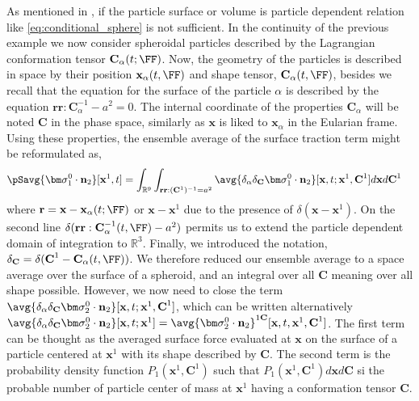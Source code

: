 As mentioned in \citet{hinch1977averaged}, if the particle surface or volume is particle dependent relation like \ref{eq:conditional_sphere} is not sufficient. 
In the continuity of the previous example we now consider spheroidal particles described by the Lagrangian conformation tensor $\textbf{C}_\alpha(t;\FF)$. 
Now, the geometry of the particles is described in space by their position $\textbf{x}_\alpha(t,\FF)$
and shape tensor, $\textbf{C}_\alpha(t,\FF)$, besides we recall that the equation for the surface of the particle $\alpha$ is described by the equation $\textbf{rr}:\textbf{C}^{-1}_\alpha - a^2 =0$. 
The internal coordinate of the properties $\textbf{C}_\alpha$ will be noted $\textbf{C}$ in the phase space, similarly as $\textbf{x}$ is liked to $\textbf{x}_\alpha$ in the Eularian frame.  
Using these properties, the ensemble average of the surface traction term might be reformulated as, 
\begin{align}
    \pSavg{\bm\sigma_1^0\cdot\textbf{n}_2}[\textbf{x}^1,t]
    &=
    \int_{\mathbb{R}^9}
    \int_{\textbf{rr}: (\textbf{C}^1)^{-1} = a^2}
    \avg{\delta_\alpha \delta_\textbf{C}  \bm\sigma_1^0\cdot \textbf{n}_2}
    [\textbf{x},t;\textbf{x}^1,\textbf{C}^1]
    d\textbf{x}d\textbf{C}^1
    \label{eq:conditional_spheroid}
\end{align}
where $\textbf{r} = \textbf{x} - \textbf{x}_{\alpha}(t;\FF)$ or $\textbf{x} - \textbf{x}^1$ due to the presence of $\delta(\textbf{x} - \textbf{x}^1)$. 
On the second line $\delta(\textbf{rr}: \textbf{C}_\alpha^{-1}(t,\FF) -a^2)$ permits us to extend the particle dependent domain of integration to $\mathbb{R}^3$. 
Finally, we introduced the notation, $\delta_\textbf{C} = \delta(\textbf{C}^1 - \textbf{C}_\alpha(t,\FF))$. 
We therefore reduced our ensemble average to a space average over the surface of a spheroid, and an integral over all $\textbf{C}$ meaning over all shape possible.
However, we now need to close the term $\avg{\delta_\alpha \delta_\textbf{C} \bm\sigma_2^0\cdot \textbf{n}_2}
[\textbf{x},t;\textbf{x}^1,\textbf{C}^1]$, which can be written alternatively $\avg{\delta_\alpha \delta_\textbf{C} \bm\sigma_2^0\cdot \textbf{n}_2}
[\textbf{x},t;\textbf{x}^1] = \avg{\bm\sigma_2^0\cdot \textbf{n}_2}^{1\textbf{C}}
[\textbf{x},t,\textbf{x}^1,\textbf{C}^1]$.
The first term can be thought as the averaged surface force evaluated at $\textbf{x}$ on the surface of a particle centered at $\textbf{x}^1$ with its shape described by $\textbf{C}$.
The second term is the probability density function $P_1(\textbf{x}^1,\textbf{C}^1)$ such that $P_1(\textbf{x}^1,\textbf{C}^1)d\textbf{x}d\textbf{C}$ si the probable number of particle center of mass at $\textbf{x}^1$ having a conformation tensor $\textbf{C}$. 




